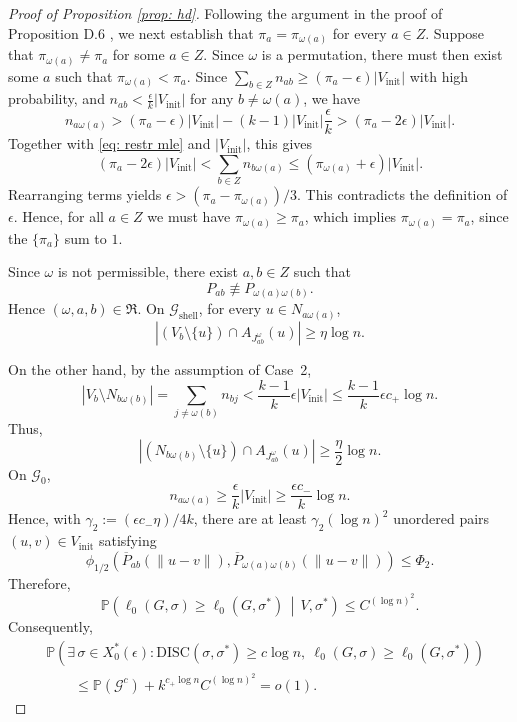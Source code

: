 \documentclass[11pt, a4paper]{amsart}
\newcommand{\1}{\mathbf{1}}
\theoremstyle{definition}
\theoremstyle{remark}
\theoremstyle{definition}
\begin{document}
\begin{proof}[Proof of Proposition \ref{prop: hd}]
Following the argument in the proof of Proposition D.6 \cite{gaudio2025incguan}, we next establish that $\pi_a=\pi_{\omega(a)}$ for every $a\in Z$. Suppose that $\pi_{\omega(a)}\neq \pi_a$ for some $a \in Z$. Since $\omega$ is a permutation, there must then exist some $a$ such that $\pi_{\omega(a)}<\pi_a$.  Since $\sum_{b \in Z} n_{ab}\ge (\pi_a - \epsilon) |V_{\mathrm{init}}|$ with high probability, and $n_{ab}<\frac{\epsilon}{k} |V_{\mathrm{init}}|$ for any $b \neq \omega(a)$, we have
\[
n_{a \omega(a)} > (\pi_a-\epsilon) |V_{\mathrm{init}}| - (k-1) |V_{\mathrm{init}}| \frac{\epsilon}{k} > (\pi_a - 2 \epsilon) |V_{\mathrm{init}}|.
\]
Together with \eqref{eq: restr mle} and $|V_{\mathrm{init}}| $, this gives
\[
(\pi_a-2\epsilon) |V_{\mathrm{init}}| < \sum_{b \in Z} n_{b \omega(a)} \le (\pi_{\omega(a)} + \epsilon)  |V_{\mathrm{init}}|.
\]
Rearranging terms yields $\epsilon > (\pi_a - \pi_{\omega(a)})/3$. This contradicts the definition of $\epsilon$. Hence, for all $a \in Z$ we must have $\pi_{\omega(a)} \ge \pi_a$, which implies $\pi_{\omega(a)}=\pi_a$, since the $\{\pi_a\}$ sum to $1$.

Since $\omega$ is not permissible, there exist
$a,b\in Z$ such that
\[
P_{ab}\not\equiv P_{\omega(a)\omega(b)}.
\]
Hence $(\omega,a,b)\in\mathfrak R$. On $\mathcal G_{\mathrm{shell}}$, for every
$u\in N_{a\omega(a)}$,
\[
\left|
(V_b\setminus\{u\})
\cap A_{J_{ab}^{\omega}}(u)
\right|
\geq\eta\log n.
\]


On the other hand, by the assumption of Case~2,
\[
|V_b\setminus N_{b\omega(b)}|
=
\sum_{j\neq\omega(b)}n_{bj}
<
\frac{k-1}{k}\epsilon |V_{\mathrm{init}}|\le \frac{k-1}{k} \epsilon c_+ \log n.
\]
Thus,
\[
|(N_{b\omega(b)}\setminus \{u\})\cap A_{J_{ab}^{\omega}}(u)|
\geq \frac{\eta}{2}\log n.
\]
On $\mathcal G_0$,
\[
n_{a\omega(a)}
\geq\frac{\epsilon}{k}|V_{\mathrm{init}}|
\ge \frac{\epsilon c_-}{k} \log n.
\]
Hence, with $\gamma_2:=(\epsilon c_- \eta)/4k$, there are at least $\gamma_2 (\log n)^2$ unordered pairs $(u,v) \in V_{\mathrm{init}}$ satisfying
\[
\phi_{1/2}\left(
\overline P_{ab}(\|u-v\|),
\overline P_{\omega(a)\omega(b)}(\|u-v\|)
\right)
\leq\Phi_2.
\]
Therefore,
\[
\mathbb P\left(
\ell_0(G,\sigma)\geq\ell_0(G,\sigma^*)
\,\middle|\,V,\sigma^*
\right)
\leq
C^{(\log n)^2}.
\]
Consequently,
\begin{align*}
&\mathbb P\left(
\exists\,\sigma\in X_0^*(\epsilon):
\mathrm{DISC}(\sigma,\sigma^*)\geq c\log n,\
\ell_0(G,\sigma)\geq\ell_0(G,\sigma^*)
\right)
\\
&\qquad\leq
\mathbb P(\mathcal G^c)
+
k^{c_+\log n}C^{(\log n)^2}
=o(1).
\end{align*}
\end{proof}
\end{document}
